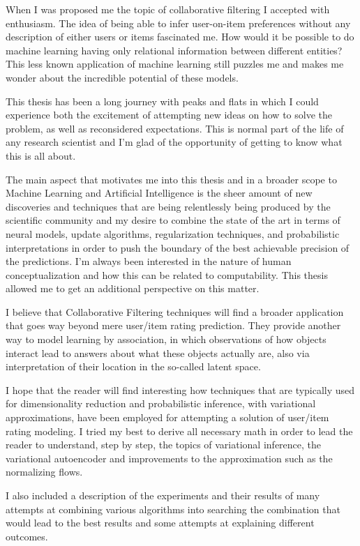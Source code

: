 
When I was proposed me the topic
of collaborative filtering
I accepted with enthusiasm.
The idea of being able to infer user-on-item preferences
without any description of either users
or items fascinated me. How would it be
possible to do machine learning
having only relational information between different
entities? This less known application of machine learning still puzzles me and makes me
wonder about the incredible potential of these models.

This thesis has been a long journey with peaks and flats in which I could
experience both the excitement of attempting new 
ideas on how to solve the problem, as well as reconsidered expectations.
This is normal part of the life of any research scientist
and I'm glad of the opportunity of getting to know what this is all about.

The main aspect that motivates me into this thesis and in a broader scope to
Machine Learning and Artificial Intelligence is the sheer amount of new discoveries and
techniques that are being relentlessly being produced by the scientific community
and my desire to combine the state of the art in terms of neural models, 
update algorithms,
regularization techniques,
and probabilistic interpretations in order to push the boundary
of the best achievable precision of the predictions.
I'm always been interested in the nature of human conceptualization
and how this can be related to computability. This thesis
allowed me to get an additional perspective on this matter.

I believe that Collaborative Filtering techniques will find a broader application
that goes way beyond mere user/item rating prediction. They provide another way
to model learning by association, in which observations of how objects interact
lead to answers about what these objects actually are, also via interpretation
of their location in the so-called latent space.

I hope that the reader will find interesting how techniques that are typically
used for dimensionality reduction and probabilistic inference, with variational
approximations, have been employed for attempting a solution of
user/item rating modeling. I tried my best to derive all necessary math
in order to lead the reader to understand, step by step, the topics of
variational inference, the variational autoencoder and improvements to
the approximation such as the normalizing flows.

I also included a description of the experiments and their results of
many attempts at combining various algorithms
into searching
the combination that would lead to the best results
and some attempts at explaining different outcomes.
